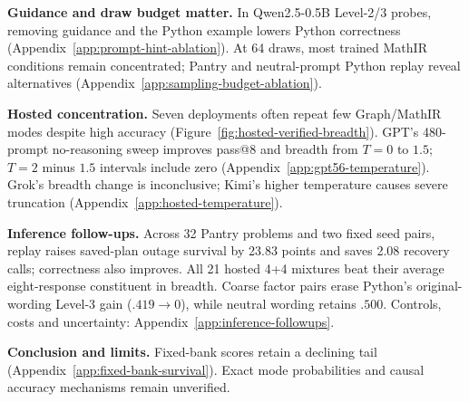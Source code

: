 \noindent\textbf{Guidance and draw budget matter.}
In Qwen2.5-0.5B Level-2/3 probes, removing guidance and the Python example
lowers Python correctness (Appendix~\ref{app:prompt-hint-ablation}).
At 64 draws, most trained MathIR conditions remain concentrated; Pantry and
neutral-prompt Python replay reveal alternatives (Appendix~\ref{app:sampling-budget-ablation}).

\noindent\textbf{Hosted concentration.}
\label{sec:hosted-concentration}
Seven deployments often repeat few Graph/MathIR modes despite high accuracy
(Figure~\ref{fig:hosted-verified-breadth}). GPT's 480-prompt no-reasoning sweep
improves pass@8 and breadth from $T=0$ to $1.5$; $T=2$ minus $1.5$ intervals
include zero (Appendix~\ref{app:gpt56-temperature}). Grok's breadth change is inconclusive; Kimi's higher temperature causes
severe truncation (Appendix~\ref{app:hosted-temperature}).

\noindent\textbf{Inference follow-ups.}
Across 32 Pantry problems and two fixed seed pairs, replay raises saved-plan
outage survival by 23.83 points and saves 2.08 recovery calls; correctness also
improves. All 21 hosted 4+4 mixtures beat their average eight-response
constituent in breadth. Coarse factor pairs erase Python's original-wording
Level-3 gain ($.419\to0$), while neutral wording retains $.500$.
Controls, costs and uncertainty: Appendix~\ref{app:inference-followups}.

\noindent\textbf{Conclusion and limits.}
\label{sec:conclusion}\label{sec:discussion}\label{sec:limitations}
Fixed-bank scores retain a declining tail (Appendix~\ref{app:fixed-bank-survival}).
Exact mode probabilities and causal accuracy mechanisms remain unverified.

\label{main:lastpage}

\clearpage


\clearpage
\appendix


